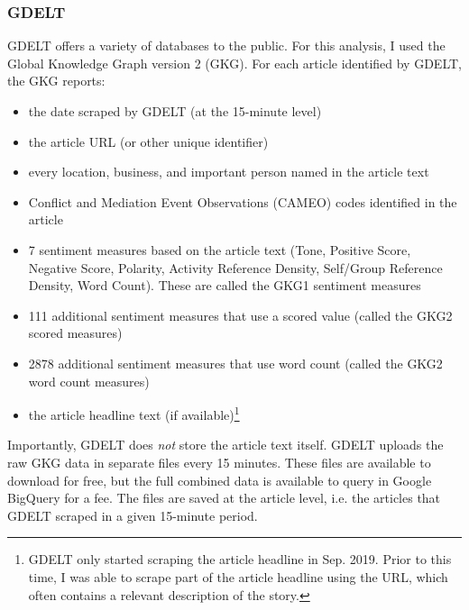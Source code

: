 \documentclass[12pt]{article}
\begin{document}
\subsubsection{GDELT}
GDELT offers a variety of databases to the public. For this analysis, I used the Global Knowledge Graph version 2 (GKG). For each article identified by GDELT, the GKG reports:
\begin{itemize}
\singlespacing
    \item the date scraped by GDELT (at the 15-minute level)
    \item the article URL (or other unique identifier)
    \item every location, business, and important person named in the article text
    \item Conflict and Mediation Event Observations (CAMEO) codes identified in the article
    \item 7 sentiment measures based on the article text (Tone, Positive Score, Negative Score, Polarity, Activity Reference Density, Self/Group Reference Density, Word Count). These are called the GKG1 sentiment measures
    \item 111 additional sentiment measures that use a scored value (called the GKG2 scored measures)
    \item 2878 additional sentiment measures that use word count (called the GKG2 word count measures)
    \item the article headline text (if available)\footnote{GDELT only started scraping the article headline in Sep. 2019. Prior to this time, I was able to scrape part of the article headline using the URL, which often contains a relevant description of the story.}
\end{itemize}
Importantly, GDELT does \textit{not} store the article text itself. GDELT uploads the raw GKG data in separate files every 15 minutes. These files are available to download for free, but the full combined data is available to query in Google BigQuery for a fee. The files are saved at the article level, i.e. the articles that GDELT scraped in a given 15-minute period.
\end{document}
